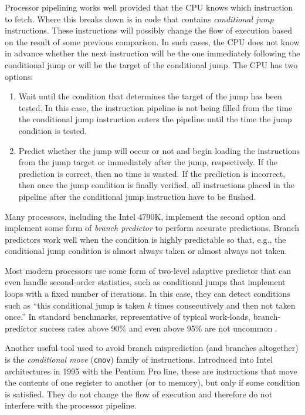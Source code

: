 \documentclass{patmorin}
\begin{document}
Processor pipelining works well provided that the CPU knows which
instruction to fetch.  Where this breaks down is in code that contains
\emph{conditional jump} instructions. These instructions will possibly
change the flow of execution based on the result of some previous
comparison.  In such cases, the CPU does not know in advance whether the
next instruction will be the one immediately following the conditional
jump or will be the target of the conditional jump. The CPU has two
options:
\begin{enumerate}
  \item Wait until the condition that determines the target
   of the jump has been tested. In this case, the instruction pipeline
   is not being filled from the time the conditional jump instruction
   enters the pipeline until the time the jump condition is tested.

  \item Predict whether the jump will occur or not and begin loading
  the instructions from the jump target or immediately after the jump,
  respectively.  If the prediction is correct, then no
  time is wasted. If the prediction is incorrect, then once the jump
  condition is finally verified, all instructions placed in the pipeline
  after the conditional jump instruction have to be flushed.
\end{enumerate}

Many processors, including the Intel 4790K, implement the second
option and implement some form of \emph{branch predictor} to perform
accurate predictions.  Branch predictors work well when the condition
is highly predictable so that, e.g., the conditional jump condition is
almost always taken or almost always not taken.

Most modern processors use some form of two-level adaptive predictor
\cite{yeh.patt:two-level} that can even handle second-order statistics,
such as conditional jumps that implement loops with a fixed number of
iterations. In this case, they can detect conditions such as ``this
conditional jump is taken $k$ times consecutively and then not taken
once.''  In standard benchmarks, representative of typical work-loads,
branch-predictor success rates above 90\% and even above 95\% are not
uncommon \cite{yeh.patt:alternative}.

Another useful tool used to avoid branch misprediction (and branches
altogether) is the \emph{conditional move} (\texttt{cmov}) family
of instructions.  Introduced into Intel architectures in 1995 with
the Pentium Pro line, these are instructions that move the contents of
one register to another (or to memory), but only if some condition is
satisfied. They do not change the flow of execution and therefore do
not interfere with the processor pipeline.
\end{document}
